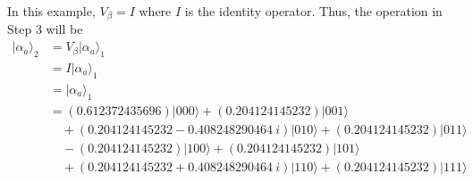 \begin{example}
In this example, $V_{\beta} = I$ where $I$ is the identity operator. Thus, the operation in Step 3 will be
	\begin{align*}
		\vert \alpha_{a} \rangle_2 &= V_{\beta}\vert \alpha_{a} \rangle_1 \\
		&= I\vert \alpha_{a} \rangle_1 \\
		&= \vert \alpha_{a} \rangle_1 \\
		&= (0.612372435696) \vert 000 \rangle + (0.204124145232) \vert 001 \rangle \\
		& \quad + (0.204124145232 - 0.408248290464\ i) \vert 010 \rangle + (0.204124145232) \vert 011 \rangle \\
		& \quad - (0.204124145232) \vert 100 \rangle + (0.204124145232) \vert 101 \rangle  \\
		& \quad + (0.204124145232 + 0.408248290464\ i) \vert 110 \rangle + (0.204124145232) \vert 111 \rangle
	\end{align*}


\end{example}
